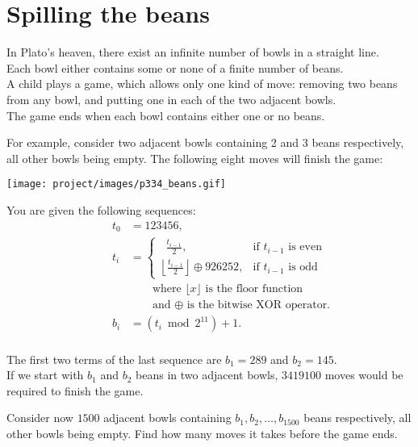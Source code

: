 \section[Problem \#334: Spilling the beans]{Spilling the beans}
\label{sec:problem_334}

In Plato's heaven, there exist an infinite number of bowls in a straight
line.\\
Each bowl either contains some or none of a finite number of beans.\\
A child plays a game, which allows only one kind of move: removing two
beans from any bowl, and putting one in each of the two adjacent
bowls.\\
The game ends when each bowl contains either one or no beans.

For example, consider two adjacent bowls containing 2 and 3 beans
respectively, all other bowls being empty. The following eight moves
will finish the game:

\begin{center}\texttt{[image: project/images/p334\_beans.gif]}\end{center}

You are given the following sequences:\\

\begin{align*}
\qquad t_0 &= 123456,\\
\qquad t_i &= \begin{cases}
\;\;\frac{t_{i-1}}{2}, & \text{if } t_{i-1} \text{ is even}\\
\left\lfloor\frac{t_{i-1}}{2}\right\rfloor\oplus 926252, & \text{if } t_{i-1} \text{ is odd}\end{cases}\\
&\qquad\text{where }\lfloor{}x \rfloor \text{ is the floor function}\\
&\qquad\!\text{and }\oplus{}\text{ is the bitwise XOR operator.}\\
\qquad b_i &= (t_i\bmod2^{11}) + 1.\\
\end{align*}

The first two terms of the last sequence are $b_1 = 289$ and
$b_2 = 145$.\\
If we start with $b_1$ and $b_2$ beans in
two adjacent bowls, $3419100$ moves would be required to
finish the game.

Consider now $1500$ adjacent bowls containing
$b_1, b_2, \ldots, b_{1500}$ beans respectively, all other bowls being empty.
Find how many moves it takes before the game ends.